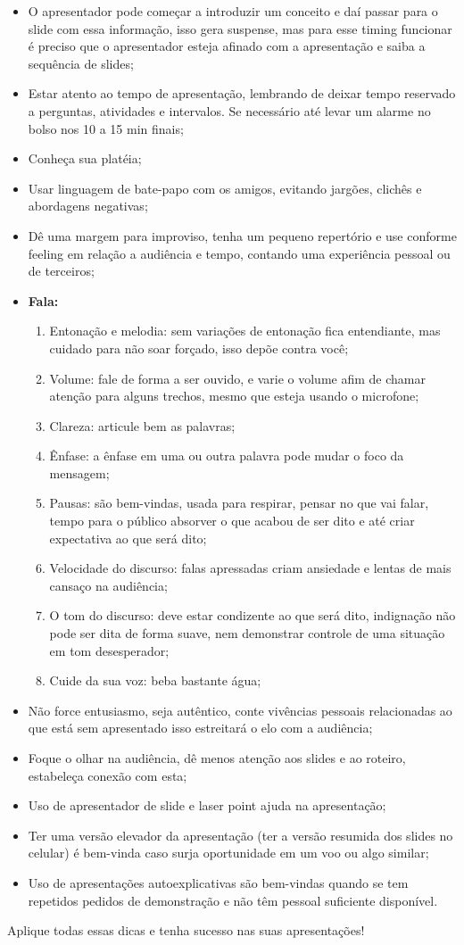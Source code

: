 \begin{itemize}
    \item O apresentador pode começar a introduzir um conceito e daí passar para o slide com essa informação, isso gera suspense, mas para esse timing funcionar é preciso que o apresentador esteja afinado com a apresentação e saiba a sequência de slides;
    \item Estar atento ao tempo de apresentação, lembrando de deixar tempo reservado a perguntas, atividades e intervalos. Se necessário até levar um alarme no bolso nos 10 a 15 min finais;
    \item Conheça sua platéia; 
    \item Usar linguagem de bate-papo com os amigos, evitando jargões, clichês e abordagens negativas;
    \item Dê uma margem para improviso, tenha um pequeno repertório e use conforme feeling em relação a audiência e tempo, contando uma experiência pessoal ou de terceiros;
    \item \textbf{Fala:} 
     \begin{enumerate}
        \item Entonação e melodia: sem variações de entonação fica entendiante, mas cuidado para não soar forçado, isso depõe contra você; 
        \item Volume: fale de forma a ser ouvido, e varie o volume afim de chamar atenção para alguns trechos, mesmo que esteja usando o microfone; 
        \item Clareza: articule bem as palavras; 
        \item Ênfase: a ênfase em uma ou outra palavra pode mudar o foco da mensagem; 
        \item Pausas: são bem-vindas, usada para respirar, pensar no que vai falar, tempo para o público absorver o que acabou de ser dito e até criar expectativa ao que será dito; 
        \item Velocidade do discurso: falas apressadas criam ansiedade e lentas de mais cansaço na audiência; 
        \item O tom do discurso: deve estar condizente ao que será dito, indignação não pode ser dita de forma suave, nem demonstrar controle de uma situação em tom desesperador;
        \item Cuide da sua voz: beba bastante água;  
     \end{enumerate}
    \item Não force entusiasmo, seja autêntico, conte vivências pessoais relacionadas ao que está sem apresentado isso estreitará o elo com a audiência;
    \item Foque o olhar na audiência, dê menos atenção aos slides e ao roteiro, estabeleça conexão com esta;
    \item Uso de apresentador de slide e laser point ajuda na apresentação;
    \item Ter uma versão elevador da apresentação (ter a versão resumida dos slides no celular) é bem-vinda caso surja oportunidade em um voo ou algo similar;
    \item  Uso de apresentações autoexplicativas são bem-vindas quando se tem repetidos pedidos de demonstração e não têm pessoal suficiente disponível.
\end{itemize}


Aplique todas essas dicas e tenha sucesso nas suas apresentações!



